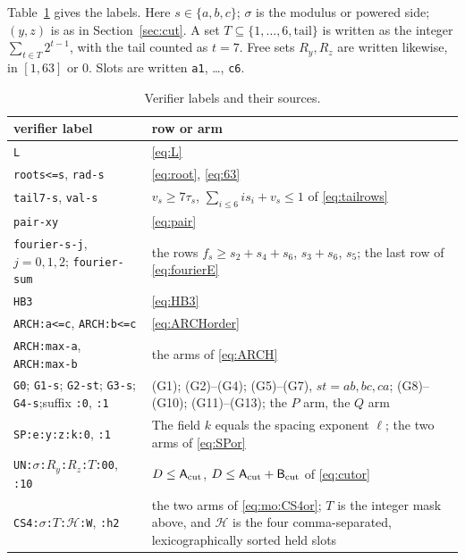 \documentclass{amsart}
\theoremstyle{definition}
\theoremstyle{plain}
\numberwithin{equation}{section}
\numberwithin{table}{section}
\begin{document}
Table~\ref{tab:rows} gives the labels. Here $s\in\{a,b,c\}$; $\sigma$ is the
modulus or powered side; $(y,z)$ is as in Section~\ref{sec:cut}. A set
$T\subseteq\{1,\dots,6,\mathrm{tail}\}$ is written as the integer
$\sum_{t\in T}2^{t-1}$, with the tail counted as $t=7$. Free sets $R_y,R_z$
are written likewise, in $[1,63]$ or $0$. Slots are written \texttt{a1}, \dots,
\texttt{c6}.

\begin{table}[ht]
\centering\scriptsize
\caption{Verifier labels and their sources.}\label{tab:rows}
\renewcommand{\arraystretch}{1.15}
\begin{tabular}{@{}>{\raggedright\arraybackslash}p{}@{\quad}>{\raggedright\arraybackslash}p{}@{}}
\hline verifier label & row or arm\\\hline
\texttt{L} & \eqref{eq:L}\\
\texttt{roots<=s}, \texttt{rad-s} & \eqref{eq:root}, \eqref{eq:63}\\
\texttt{tail7-s}, \texttt{val-s} & $v_s\ge7\tau_s$, $\sum_{i\le6}is_i+v_s\le1$ of \eqref{eq:tailrows}\\
\texttt{pair-xy} & \eqref{eq:pair}\\
\texttt{fourier-s-j}, $j=0,1,2$; \texttt{fourier-sum} & the rows $f_s\ge s_2+s_4+s_6$, $s_3+s_6$, $s_5$; the last row of \eqref{eq:fourierE}\\
\texttt{HB3} & \eqref{eq:HB3}\\
\texttt{ARCH:a<=c}, \texttt{ARCH:b<=c} & \eqref{eq:ARCHorder}\\
\texttt{ARCH:max-a}, \texttt{ARCH:max-b} & the arms of \eqref{eq:ARCH}\\
\texttt{G0}; \texttt{G1-s}; \texttt{G2-st}; \texttt{G3-s}; \texttt{G4-s};\newline suffix \texttt{:0}, \texttt{:1} & (G1); (G2)--(G4); (G5)--(G7), $st=ab,bc,ca$; (G8)--(G10); (G11)--(G13); the $P$ arm, the $Q$ arm\\
\texttt{SP:e:y:z:k:0}, \texttt{:1} & The field $k$ equals the spacing exponent $\ell$; the two arms of \eqref{eq:SPor}\\
\texttt{UN:}$\sigma$\texttt{:}$R_y$\texttt{:}$R_z$\texttt{:}$T$\texttt{:00}, \texttt{:10} & $D\le\mathsf A_{\rm cut}$, $D\le\mathsf A_{\rm cut}+\mathsf B_{\rm cut}$ of \eqref{eq:cutor}\\
\texttt{CS4:}$\sigma$\texttt{:}$T$\texttt{:}$\mathcal H$\texttt{:W}, \texttt{:h2} & the two arms of \eqref{eq:mo:CS4or}; $T$ is the integer mask above, and $\mathcal H$ is the four comma-separated, lexicographically sorted held slots\\

\end{tabular}
\end{table}
\end{document}
